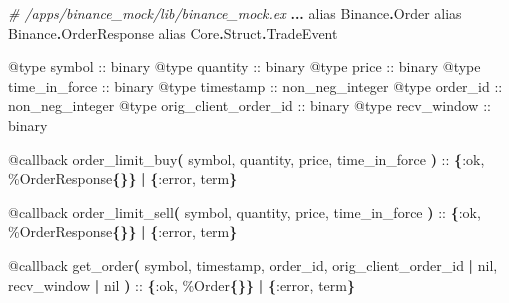 \documentclass[
  oneside]{book}
\newenvironment{Shaded}{\begin{snugshade}}{\end{snugshade}}
\newcommand{\CommentTok}[1]{\textcolor[rgb]{0.56,0.35,0.01}{\textit{#1}}}
\newcommand{\ConstantTok}[1]{\textcolor[rgb]{0.56,0.35,0.01}{#1}}
\newcommand{\FunctionTok}[1]{\textcolor[rgb]{0.13,0.29,0.53}{\textbf{#1}}}
\newcommand{\ImportTok}[1]{#1}
\newcommand{\NormalTok}[1]{#1}
\newcommand{\OperatorTok}[1]{\textcolor[rgb]{0.81,0.36,0.00}{\textbf{#1}}}
\newcommand{\OtherTok}[1]{\textcolor[rgb]{0.56,0.35,0.01}{#1}}
\newcommand{\VariableTok}[1]{\textcolor[rgb]{0.00,0.00,0.00}{#1}}
\begin{document}
\begin{Shaded}
\begin{Highlighting}[]
\CommentTok{\# /apps/binance\_mock/lib/binance\_mock.ex}
  \OperatorTok{...}
  \ImportTok{alias} \ConstantTok{Binance}\OperatorTok{.}\ConstantTok{Order}
  \ImportTok{alias} \ConstantTok{Binance}\OperatorTok{.}\ConstantTok{OrderResponse}
  \ImportTok{alias} \ConstantTok{Core}\OperatorTok{.}\ConstantTok{Struct}\OperatorTok{.}\ConstantTok{TradeEvent}

  \OtherTok{@type}\NormalTok{ symbol :: binary}
  \OtherTok{@type}\NormalTok{ quantity :: binary}
  \OtherTok{@type}\NormalTok{ price :: binary}
  \OtherTok{@type}\NormalTok{ time\_in\_force :: binary}
  \OtherTok{@type}\NormalTok{ timestamp :: non\_neg\_integer}
  \OtherTok{@type}\NormalTok{ order\_id :: non\_neg\_integer}
  \OtherTok{@type}\NormalTok{ orig\_client\_order\_id :: binary}
  \OtherTok{@type}\NormalTok{ recv\_window :: binary}

  \OtherTok{@callback}\NormalTok{ order\_limit\_buy}\FunctionTok{(}
\NormalTok{              symbol,}
\NormalTok{              quantity,}
\NormalTok{              price,}
\NormalTok{              time\_in\_force}
            \FunctionTok{)}\NormalTok{ :: }\FunctionTok{\{}\VariableTok{:ok}\NormalTok{, \%}\ConstantTok{OrderResponse}\FunctionTok{\{\}\}} \OperatorTok{|} \FunctionTok{\{}\VariableTok{:error}\NormalTok{, term}\FunctionTok{\}}

  \OtherTok{@callback}\NormalTok{ order\_limit\_sell}\FunctionTok{(}
\NormalTok{              symbol,}
\NormalTok{              quantity,}
\NormalTok{              price,}
\NormalTok{              time\_in\_force}
            \FunctionTok{)}\NormalTok{ :: }\FunctionTok{\{}\VariableTok{:ok}\NormalTok{, \%}\ConstantTok{OrderResponse}\FunctionTok{\{\}\}} \OperatorTok{|} \FunctionTok{\{}\VariableTok{:error}\NormalTok{, term}\FunctionTok{\}}

  \OtherTok{@callback}\NormalTok{ get\_order}\FunctionTok{(}
\NormalTok{              symbol,}
\NormalTok{              timestamp,}
\NormalTok{              order\_id,}
\NormalTok{              orig\_client\_order\_id }\OperatorTok{|} \ConstantTok{nil}\NormalTok{,}
\NormalTok{              recv\_window }\OperatorTok{|} \ConstantTok{nil}
            \FunctionTok{)}\NormalTok{ :: }\FunctionTok{\{}\VariableTok{:ok}\NormalTok{, \%}\ConstantTok{Order}\FunctionTok{\{\}\}} \OperatorTok{|} \FunctionTok{\{}\VariableTok{:error}\NormalTok{, term}\FunctionTok{\}}
\end{Highlighting}
\end{Shaded}
\end{document}
